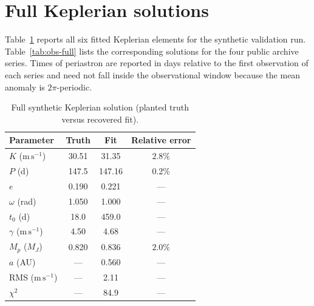 \documentclass[11pt]{article}
\begin{document}

\section{Full Keplerian solutions}
\label{app:elements}

Table~\ref{tab:synth-full} reports all six fitted Keplerian elements for the
synthetic validation run. Table~\ref{tab:obs-full} lists the corresponding
solutions for the four public archive series. Times of periastron are reported
in days relative to the first observation of each series and need not fall
inside the observational window because the mean anomaly is $2\pi$-periodic.

\begin{table}[H]
\centering
\caption{Full synthetic Keplerian solution (planted truth versus recovered fit).}
\label{tab:synth-full}
\begin{tabular}{@{}lccc@{}}
\toprule
Parameter & Truth & Fit & Relative error \\
\midrule
$K$ ($\mathrm{m\,s^{-1}}$) & 30.51 & 31.35 & $2.8\%$ \\
$P$ (d) & 147.5 & 147.16 & $0.2\%$ \\
$e$ & 0.190 & 0.221 & --- \\
$\omega$ (rad) & 1.050 & 1.000 & --- \\
$t_0$ (d) & 18.0 & 459.0 & --- \\
$\gamma$ ($\mathrm{m\,s^{-1}}$) & 4.50 & 4.68 & --- \\
$M_p$ ($M_J$) & 0.820 & 0.836 & $2.0\%$ \\
$a$ (AU) & --- & 0.560 & --- \\
RMS ($\mathrm{m\,s^{-1}}$) & --- & 2.11 & --- \\
$\chi^2$ & --- & 84.9 & --- \\
\bottomrule
\end{tabular}
\end{table}
\end{document}
